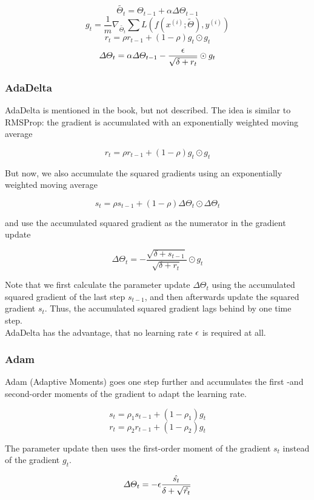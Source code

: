 \begin{multicols}{2}
		\[ \tilde{\Theta_{t}} = \Theta_{t-1} + \alpha \Delta\Theta_{t-1} \]
		\[ g_{t} = \frac{1}{m} \nabla_{\tilde{\Theta_{t}}} \sum L(f(x^{(i)};\tilde{\Theta}),y^{(i)})    \]
		\[ r_{t} = \rho r_{t-1} + (1- \rho) g_{t}\odot g_{t}\]
		\[ \Delta\Theta_{t} = \alpha\Delta\Theta_{t-1} - \frac{{\epsilon}}{\sqrt{\delta + r_{t}}} \odot g_{t} \]
		
		\subsubsection{AdaDelta}
		AdaDelta is mentioned in the book, but not described. The idea is similar to RMSProp: the gradient is accumulated with an exponentially weighted moving average
		
		\[ r_{t} = \rho r_{t-1} + (1- \rho) g_{t}\odot g_{t}\]
		
		But now, we also accumulate the squared gradients using an exponentially weighted moving average
		
		\[ s_{t} = \rho s_{t-1} + (1 - \rho)\Delta\Theta_{t} \odot \Delta\Theta_{t} \]
		
		and use the accumulated squared gradient as the numerator in the gradient update
		
		\[ \Delta\Theta_{t} = - \frac{\sqrt{\delta + s_{t-1}}}{\sqrt{\delta + r_{t}}} \odot g_{t}\]
		
		Note that we first calculate the parameter update $ \Delta\Theta_{t} $ using the accumulated squared gradient of the last step $ s_{t-1} $, and then afterwards update the squared gradient $ s_{t} $. Thus, the accumulated squared gradient lags behind by one time step.\\
		AdaDelta has the advantage, that no learning rate $ {\epsilon} $ is required at all.
			
		\subsubsection{Adam}
		Adam (Adaptive Moments) goes one step further and accumulates the first -and second-order moments of the gradient to adapt the learning rate.
		
		\[ s_{t} = \rho_{1} s_{t-1} + (1 - \rho_{1})g_{t} \]
		\[ r_{t} = \rho_{2} r_{t-1} + (1 - \rho_{2})g_{t} \]
		
		The parameter update then uses the first-order moment of the gradient $ s_{t} $ instead of the gradient $ g_{t} $.
		
		\[ \Delta\Theta_{t} = -{\epsilon}\frac{\hat{s_{t}}}{\delta + \sqrt{\hat{r_{t}}}} \]
		

\end{multicols}
